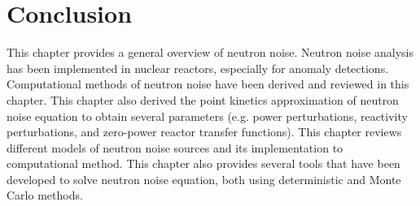 \section{Conclusion}

This chapter provides a general overview of neutron noise. Neutron noise analysis has been implemented in nuclear reactors, especially for anomaly detections. Computational methods of neutron noise have been derived and reviewed in this chapter. This chapter also derived the point kinetics approximation of neutron noise equation to obtain several parameters (e.g. power perturbations, reactivity perturbations, and zero-power reactor transfer functions). This chapter reviews different models of neutron noise sources and its implementation to computational method. This chapter also provides several tools that have been developed to solve neutron noise equation, both using deterministic and Monte Carlo methods.

